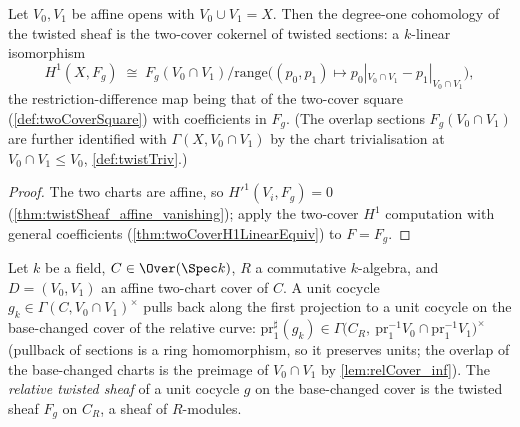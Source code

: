 \begin{definition}
  \label{def:twistTwoCoverH1}
  \leanok
  Let \(V_0, V_1\) be affine opens with \(V_0 \cup V_1 = X\). Then the degree-one
  cohomology of the twisted sheaf is the two-cover cokernel of twisted sections: a
  \(k\)-linear isomorphism
  \[
    H^1(X, F_g) \;\cong\;
      F_g(V_0 \cap V_1) \big/ \mathrm{range}\bigl((p_0, p_1) \mapsto
        p_0|_{V_0 \cap V_1} - p_1|_{V_0 \cap V_1}\bigr),
  \]
  the restriction-difference map being that of the two-cover square
  (\ref{def:twoCoverSquare}) with coefficients in \(F_g\). (The overlap sections
  \(F_g(V_0 \cap V_1)\) are further identified with \(\Gamma(X, V_0 \cap V_1)\) by the
  chart trivialisation at \(V_0 \cap V_1 \le V_0\), \ref{def:twistTriv}.)
\end{definition}
\begin{proof}
  \leanok
  The two charts are affine, so \(H'^1(V_i, F_g) = 0\)
  (\ref{thm:twistSheaf_affine_vanishing}); apply the two-cover \(H^1\) computation with
  general coefficients (\ref{thm:twoCoverH1LinearEquiv}) to \(F = F_g\).
\end{proof}

\begin{definition}
  \label{def:relTwistSheaf}
  \leanok
  Let \(k\) be a field, \(C \in \Over(\Spec k)\), \(R\) a commutative \(k\)-algebra, and
  \(D = (V_0, V_1)\) an affine two-chart cover of \(C\). A unit cocycle
  \(g_k \in \Gamma(C, V_0 \cap V_1)^{\times}\) pulls back along the first projection to a
  unit cocycle on the base-changed cover of the relative curve:
  \(\mathrm{pr}_1^{\sharp}(g_k) \in
  \Gamma\bigl(C_R,\ \mathrm{pr}_1^{-1}V_0 \cap \mathrm{pr}_1^{-1}V_1\bigr)^{\times}\)
  (pullback of sections is a ring homomorphism, so it preserves units; the overlap of the
  base-changed charts is the preimage of \(V_0 \cap V_1\) by \ref{lem:relCover_inf}). The
  \emph{relative twisted sheaf} of a unit cocycle \(g\) on the base-changed cover is the
  twisted sheaf \(F_g\) on \(C_R\), a sheaf of \(R\)-modules.
\end{definition}

